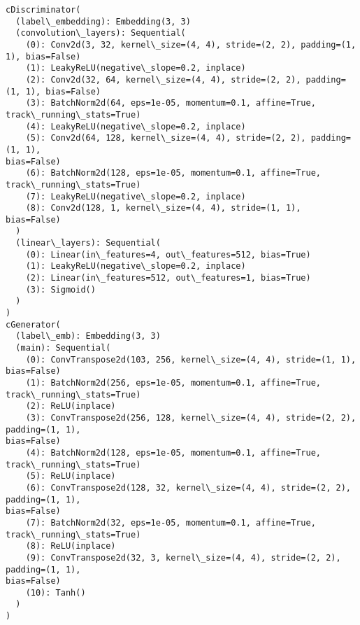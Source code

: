 \documentclass[11pt]{article}
\begin{document}
    \begin{Verbatim}[commandchars=\\\{\},fontsize=\footnotesize]
cDiscriminator(
  (label\_embedding): Embedding(3, 3)
  (convolution\_layers): Sequential(
    (0): Conv2d(3, 32, kernel\_size=(4, 4), stride=(2, 2), padding=(1, 1), bias=False)
    (1): LeakyReLU(negative\_slope=0.2, inplace)
    (2): Conv2d(32, 64, kernel\_size=(4, 4), stride=(2, 2), padding=(1, 1), bias=False)
    (3): BatchNorm2d(64, eps=1e-05, momentum=0.1, affine=True,
track\_running\_stats=True)
    (4): LeakyReLU(negative\_slope=0.2, inplace)
    (5): Conv2d(64, 128, kernel\_size=(4, 4), stride=(2, 2), padding=(1, 1),
bias=False)
    (6): BatchNorm2d(128, eps=1e-05, momentum=0.1, affine=True,
track\_running\_stats=True)
    (7): LeakyReLU(negative\_slope=0.2, inplace)
    (8): Conv2d(128, 1, kernel\_size=(4, 4), stride=(1, 1), bias=False)
  )
  (linear\_layers): Sequential(
    (0): Linear(in\_features=4, out\_features=512, bias=True)
    (1): LeakyReLU(negative\_slope=0.2, inplace)
    (2): Linear(in\_features=512, out\_features=1, bias=True)
    (3): Sigmoid()
  )
)
cGenerator(
  (label\_emb): Embedding(3, 3)
  (main): Sequential(
    (0): ConvTranspose2d(103, 256, kernel\_size=(4, 4), stride=(1, 1), bias=False)
    (1): BatchNorm2d(256, eps=1e-05, momentum=0.1, affine=True,
track\_running\_stats=True)
    (2): ReLU(inplace)
    (3): ConvTranspose2d(256, 128, kernel\_size=(4, 4), stride=(2, 2), padding=(1, 1),
bias=False)
    (4): BatchNorm2d(128, eps=1e-05, momentum=0.1, affine=True,
track\_running\_stats=True)
    (5): ReLU(inplace)
    (6): ConvTranspose2d(128, 32, kernel\_size=(4, 4), stride=(2, 2), padding=(1, 1),
bias=False)
    (7): BatchNorm2d(32, eps=1e-05, momentum=0.1, affine=True,
track\_running\_stats=True)
    (8): ReLU(inplace)
    (9): ConvTranspose2d(32, 3, kernel\_size=(4, 4), stride=(2, 2), padding=(1, 1),
bias=False)
    (10): Tanh()
  )
)

    \end{Verbatim}
\end{document}
